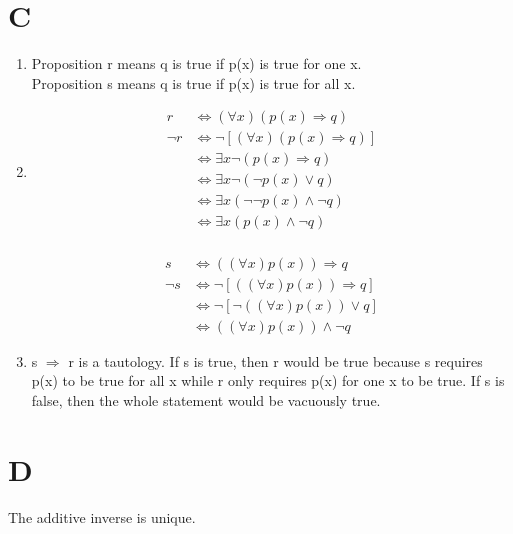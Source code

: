 \documentclass[11pt]{scrartcl}
\makeatletter
\newenvironment{Dequation}
  {%
  \def\tagform@##1{%
    \maketag@@@{\makebox[0pt][r]{(\ignorespaces##1\unskip\@@italiccorr)}}}%
  \ignorespaces
  }
  {%
  \def\tagform@##1{\maketag@@@{(\ignorespaces##1\unskip\@@italiccorr)}}%
  \ignorespacesafterend
  }
\makeatother
\begin{document}
\section{C}
\begin{enumerate}[label=\alph*.]
	\item{
			Proposition r means q is true if p(x) is true for one x. \\
			Proposition s means q is true if p(x) is true for all x.
		}
	\item{
			\begin{Dequation}
			\begin{align*}
				r & \Leftrightarrow (\forall x)(p(x) \Rightarrow q)\\
				\lnot r & \Leftrightarrow \lnot [(\forall x)(p(x) \Rightarrow q)]\\
						& \Leftrightarrow \exists x \lnot (p(x) \Rightarrow q) \tag{Quantifer Negation}\\
						& \Leftrightarrow \exists x \lnot (\lnot p(x) \lor q) \tag{Material Implication}\\
						& \Leftrightarrow \exists x (\lnot \lnot p(x) \land \lnot q) \tag{De Morgan's Law}\\
						& \Leftrightarrow \exists x (p(x) \land \lnot q) \tag{Double Negation}\\
			\end{align*}
			\end{Dequation}
		\begin{Dequation}
			\begin{align*}
				s & \Leftrightarrow ((\forall x)p(x)) \Rightarrow q \\
				\lnot s & \Leftrightarrow \lnot[((\forall x)p(x)) \Rightarrow q]\\
				& \Leftrightarrow \lnot[\lnot ((\forall x)p(x)) \lor q] \tag{Material Implication}\\
				& \Leftrightarrow ((\forall x)p(x)) \land \lnot q \tag{De Morgan's Law}
			\end{align*}
			\end{Dequation}
		}
	\item{
			s $\Rightarrow$ r is a tautology. If s is true, then r would be true because s requires p(x) to be true for all x while r only requires p(x) for one x to be true. If s is false, then the whole statement would be vacuously true.   
		}
\end{enumerate}

\section{D}
\begin{corollary*}
	The additive inverse is unique.
\end{corollary*}
\end{document}
